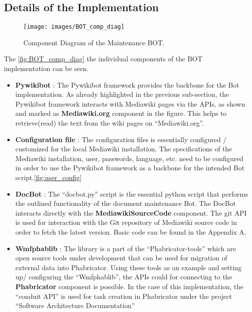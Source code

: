 \subsection{Details of the Implementation}

\begin{figure}[H]
  \centering
  \texttt{[image: images/BOT\_comp\_diag]}
  \caption[Component Diagram of the Maintenance BOT]{Component Diagram of the Maintenance BOT.}\label{fig:BOT_comp_diag}
\end{figure}
The \autoref{fig:BOT_comp_diag} the individual components of the BOT implementation can be seen. 
\begin{itemize}
\item \textbf{Pywikibot} : The Pywikibot framework provides the backbone for the Bot implementation. As already highlighted in the previous sub-section, the Pywikibot framework interacts with Mediawiki pages via the APIs, as shown and marked as \textbf{Mediawiki.org} component in the figure. This helps to retrieve(read) the text from the wiki pages on \enquote{Mediawiki.org}.
\item \textbf{Configuration file} : The configuration files is essentially configured / customized for the local Mediawiki installation. The specifications of the Mediawiki installation, user, passwords, language, etc. need to be configured in order to use the Pywikibot framework as a backbone for the intended Bot script.\autoref{fig:user_config}
\item \textbf{DocBot} : The \enquote{docbot.py} script is the essential python script that performs the outlined functionality of the document maintenance Bot. The DocBot interacts directly with the \textbf{MediawikiSourceCode} component. The git API is used for interaction with the Git repository of Mediawiki source code in order to fetch the latest version. Basic code can be found in the Appendix A.
\item \textbf{Wmfphablib} : The library is a part of the \enquote{Phabricator-tools} which are open source tools under development that can be used for migration of external data into Phabricator\cite{phab-tools}. Using these tools as an example and setting up/ configuring the \enquote{Wmfphablib}, the APIs could for connecting to the \textbf{Phabricator} component is possible. In the case of this implementation, the \enquote{conduit API} is used for task creation in Phabricator under the project \enquote{Software Architecture Documentation}

\end{itemize}

